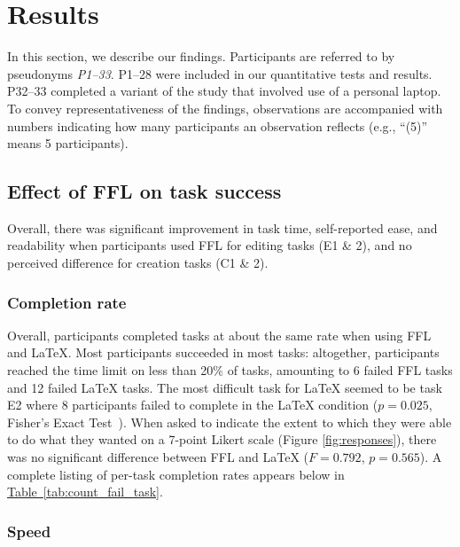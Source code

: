 \section{Results}\label{results}

In this section, we describe our findings. Participants are referred to by pseudonyms \textit{P1--33}. P1--28 were included in our quantitative tests and results. P32--33 completed a variant of the study that involved use of a personal laptop. To convey representativeness of the findings, observations are accompanied with numbers indicating how many participants an observation reflects (e.g., ``(5)'' means 5 participants).

\subsection{Effect of FFL on task success}

Overall, there was significant improvement in task time, self-reported ease, and readability when participants used FFL for editing tasks (E1 \& 2), and no perceived difference for creation tasks (C1 \& 2).

\subsubsection{Completion rate} Overall, participants completed tasks at about the same rate when using FFL and LaTeX. Most participants succeeded in most tasks: altogether, participants reached the time limit on less than 20\% of tasks, amounting to 6 failed FFL tasks and 12 failed LaTeX tasks. The most difficult task for LaTeX seemed to be task E2 where 8 participants failed to complete in the LaTeX condition ($p=0.025$, {Fisher's Exact Test}~\cite{fisher}).
When asked to indicate the extent to which they were able to do what they wanted on a 7-point Likert scale (Figure \ref{fig:responses}), there was no significant difference between FFL and LaTeX ($F=0.792$, $p=0.565$).
A complete listing of per-task completion rates appears below in \hyperref[tab:count_fail_task]{Table~\ref{tab:count_fail_task}}.

\subsubsection{Speed}

